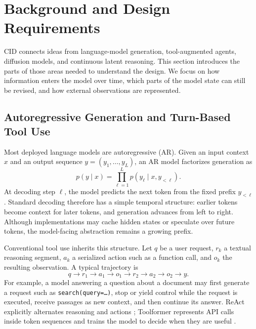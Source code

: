 \section{Background and Design Requirements}
\label{sec:background}

CID connects ideas from language-model generation, tool-augmented agents, diffusion models, and continuous latent reasoning. This section introduces the parts of those areas needed to understand the design. We focus on how information enters the model over time, which parts of the model state can still be revised, and how external observations are represented.

\subsection{Autoregressive Generation and Turn-Based Tool Use}

Most deployed language models are autoregressive (AR). Given an input context $x$ and an output sequence $y=(y_1,\ldots,y_L)$, an AR model factorizes generation as
\begin{equation}
  p(y\mid x)=\prod_{\ell=1}^{L}p(y_\ell\mid x,y_{<\ell}).
  \label{eq:ar-factorization}
\end{equation}
At decoding step $\ell$, the model predicts the next token from the fixed prefix $y_{<\ell}$. Standard decoding therefore has a simple temporal structure: earlier tokens become context for later tokens, and generation advances from left to right. Although implementations may cache hidden states or speculate over future tokens, the model-facing abstraction remains a growing prefix.

Conventional tool use inherits this structure. Let $q$ be a user request, $r_k$ a textual reasoning segment, $a_k$ a serialized action such as a function call, and $o_k$ the resulting observation. A typical trajectory is
\begin{equation}
  q \rightarrow r_1 \rightarrow a_1 \rightarrow o_1
  \rightarrow r_2 \rightarrow a_2 \rightarrow o_2 \rightarrow y.
  \label{eq:turn-based}
\end{equation}
For example, a model answering a question about a document may first generate a request such as \texttt{search(query=\ldots)}, stop or yield control while the request is executed, receive passages as new context, and then continue its answer. ReAct explicitly alternates reasoning and actions \citep{yao2022react}; Toolformer represents API calls inside token sequences and trains the model to decide when they are useful \citep{schick2023toolformer}.


